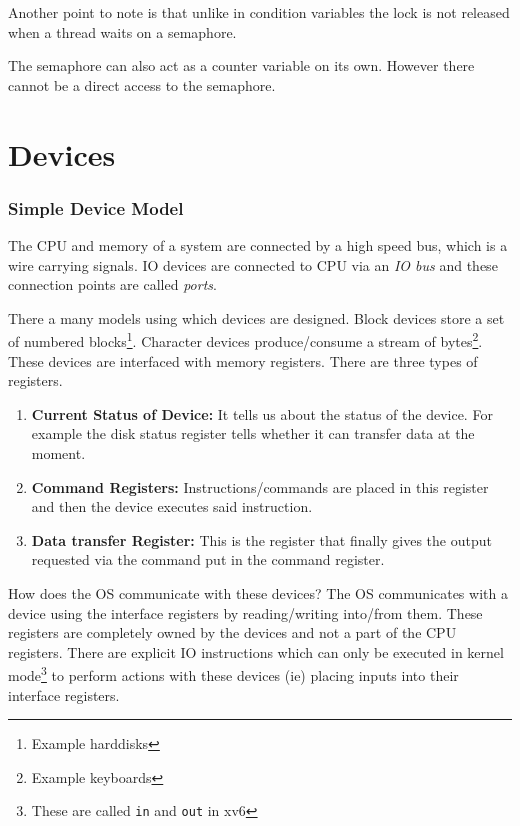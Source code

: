 \documentclass[12pt]{article}
\begin{document}
Another point to note is that unlike in condition variables the lock is not released when a thread waits on a semaphore. 


The semaphore can also act as a counter variable on its own. However there cannot be a direct access to the semaphore.




\newpage
\part{Devices}



\section{Simple Device Model}
The CPU and memory of a system are connected by a high speed bus, which is a wire carrying signals. IO devices are connected to CPU via an \textit{IO bus} and these connection points are called \textit{ports}.

There a many models using which devices are designed. Block devices store a set of numbered blocks\footnote{Example harddisks}. Character devices produce/consume a stream of bytes\footnote{Example keyboards}.
These devices are interfaced with memory registers. There are three types of registers.\
\begin{enumerate}[topsep = 0cm, parsep = 0cm, itemsep = 0cm]
    \item \textbf{Current Status of Device:} It tells us about the status of the device. For example the disk status register tells whether it can transfer data at the moment.
    \item \textbf{Command Registers:} Instructions/commands are placed in this register and then the device executes said instruction.
    \item \textbf{Data transfer Register:} This is the register that finally gives the output requested via the command put in the command register. 
\end{enumerate} 

How does the OS communicate with these devices? The OS communicates with a device using the interface registers by reading/writing into/from them. These
registers are completely owned by the devices and not a part of the CPU registers. 
There are explicit IO instructions which can only be executed in kernel mode\footnote{These are called \texttt{in} and \texttt{out} in xv6 } to perform actions with these devices (ie) placing inputs into their interface registers. 
\end{document}
